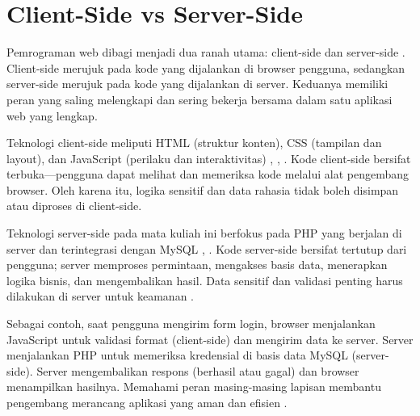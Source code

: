 \section{Client-Side vs Server-Side}

Pemrograman web dibagi menjadi dua ranah utama: client-side dan server-side \cite{mdn-learn}. Client-side merujuk pada kode yang dijalankan di browser pengguna, sedangkan server-side merujuk pada kode yang dijalankan di server. Keduanya memiliki peran yang saling melengkapi dan sering bekerja bersama dalam satu aplikasi web yang lengkap.

Teknologi client-side meliputi HTML (struktur konten), CSS (tampilan dan layout), dan JavaScript (perilaku dan interaktivitas) \cite{mdn-html}, \cite{mdn-css}, \cite{mdn-js}. Kode client-side bersifat terbuka—pengguna dapat melihat dan memeriksa kode melalui alat pengembang browser. Oleh karena itu, logika sensitif dan data rahasia tidak boleh disimpan atau diproses di client-side.

Teknologi server-side pada mata kuliah ini berfokus pada PHP yang berjalan di server dan terintegrasi dengan MySQL \cite{php-manual}, \cite{mysql}. Kode server-side bersifat tertutup dari pengguna; server memproses permintaan, mengakses basis data, menerapkan logika bisnis, dan mengembalikan hasil. Data sensitif dan validasi penting harus dilakukan di server untuk keamanan \cite{php-right-way}.

Sebagai contoh, saat pengguna mengirim form login, browser menjalankan JavaScript untuk validasi format (client-side) dan mengirim data ke server. Server menjalankan PHP untuk memeriksa kredensial di basis data MySQL (server-side). Server mengembalikan respons (berhasil atau gagal) dan browser menampilkan hasilnya. Memahami peran masing-masing lapisan membantu pengembang merancang aplikasi yang aman dan efisien \cite{webdev}.
